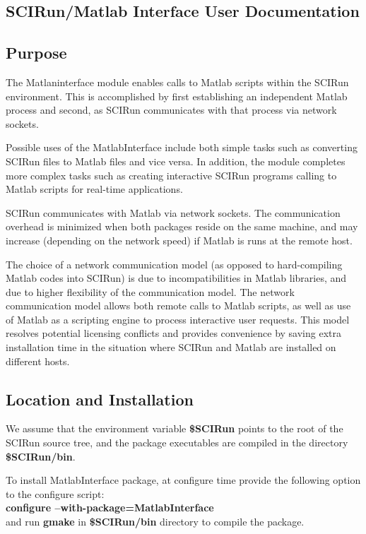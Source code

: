 \documentclass[12pt]{IEEEtran}
\newcommand{\sr}{SCIRun}
\begin{document}
\baselineskip 0.3in

\begin{centering}
\section*{SCIRun/Matlab Interface User Documentation}
\end{centering}

\subsection*{Purpose} \indent

The Matlaninterface module
enables calls to Matlab scripts within the \sr{} environment.
This is accomplished 
by first establishing an independent Matlab process and second,
as SCIRun communicates with that process via network sockets.

Possible uses of the MatlabInterface include both simple tasks
such as converting SCIRun files to Matlab files and vice versa.
In addition, the module completes more complex tasks such as creating
interactive \sr{} programs calling to Matlab scripts for real-time applications.

SCIRun communicates with Matlab via network sockets. The communication
overhead is minimized when both packages reside on the same machine, 
and may increase (depending on the network speed) if Matlab is 
runs at the remote host. 

The choice of a network communication model (as opposed to hard-compiling 
Matlab codes into \sr{}) is due to incompatibilities in Matlab
libraries, and due to higher flexibility of the communication model. 
The network communication model allows both remote calls to Matlab 
scripts, as well as use of Matlab as a scripting engine to process 
interactive user requests. This model resolves potential licensing 
conflicts and provides convenience by saving extra installation time 
in the situation where SCIRun and Matlab are installed on different hosts.

\subsection*{Location and Installation} \indent

We assume that the environment variable {\bf \$SCIRun} points to the root
of the SCIRun source tree, and the package executables are compiled in the
directory {\bf \$SCIRun/bin}.

To install MatlabInterface package, at configure time provide the
following option to the configure script: \\
{\bf configure --with-package=MatlabInterface} \\
and run {\bf gmake } in {\bf \$SCIRun/bin} directory
to compile the package. 
\end{document}
